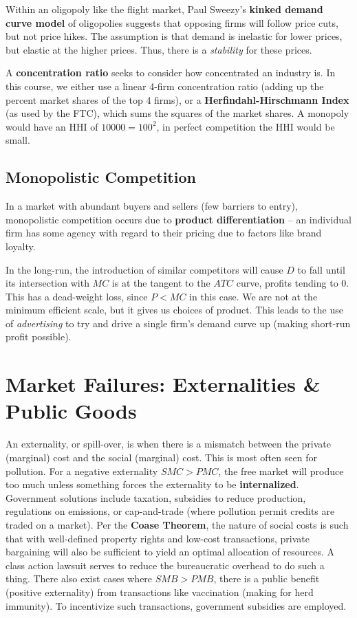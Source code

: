 \documentclass{article}
\begin{document}
Within an oligopoly like the flight market, Paul Sweezy's \textbf{kinked demand curve model} of oligopolies suggests that opposing firms will follow price cuts, but not price hikes. The assumption is that demand is inelastic for lower prices, but elastic at the higher prices. Thus, there is a \textit{stability} for these prices.

A \textbf{concentration ratio} seeks to consider how concentrated an industry is. In this course, we either use a linear 4-firm concentration ratio (adding up the percent market shares of the top 4 firms), or a \textbf{Herfindahl-Hirschmann Index} (as used by the FTC), which sums the squares of the market shares. A monopoly would have an HHI of $10000 = 100^2$, in perfect competition the HHI would be small.

\subsection{Monopolistic Competition}
In a market with abundant buyers and sellers (few barriers to entry), monopolistic competition occurs due to \textbf{product differentiation} -- an individual firm has some agency with regard to their pricing due to factors like brand loyalty.

In the long-run, the introduction of similar competitors will cause $D$ to fall until its intersection with $MC$ is at the tangent to the $ATC$ curve, profits tending to $0$. This has a dead-weight loss, since $P<MC$ in this case. We are not at the minimum efficient scale, but it gives us choices of product. This leads to the use of \textit{advertising} to try and drive a single firm's demand curve up (making short-run profit possible).

\section{Market Failures: Externalities \& Public Goods}
An externality, or spill-over, is when there is a mismatch between the private (marginal) cost and the social (marginal) cost. This is most often seen for pollution. For a negative externality $SMC>PMC$, the free market will produce too much unless something forces the externality to be \textbf{internalized}. Government solutions include taxation, subsidies to reduce production, regulations on emissions, or cap-and-trade (where pollution permit credits are traded on a market). Per the \textbf{Coase Theorem}, the nature of social costs is such that with well-defined property rights and low-cost transactions, private bargaining will also be sufficient to yield an optimal allocation of resources. A class action lawsuit serves to reduce the bureaucratic overhead to do such a thing.
There also exist cases where $SMB>PMB$, there is a public benefit (positive externality) from transactions like vaccination (making for herd immunity). To incentivize such transactions, government subsidies are employed.
\end{document}
